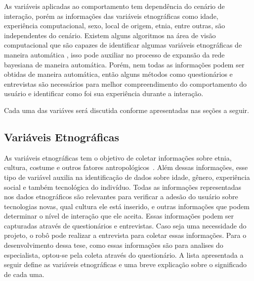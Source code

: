 As variáveis aplicadas ao comportamento tem dependência do cenário de interação, porém as informações das variáveis etnográficas como idade, experiência computacional, sexo, local de origem, etnia, entre outras, são independentes do cenário. Existem alguns algoritmos na área de visão computacional que são capazes de identificar algumas variáveis etnográficas de maneira automática \cite{yang:2007, shan:2012, ylioinas:2012, samadi:2013, amaral:2014}, isso pode auxiliar no processo de expansão da rede bayesiana de maneira automática. Porém, nem todas as informações podem ser obtidas de maneira automática, então alguns métodos como questionários e entrevistas são necessários para melhor compreendimento do comportamento do usuário e identificar como foi sua experiência durante a interação.

Cada uma das variáves será discutida conforme apresentadas nas seções a seguir.

\subsection{Variáveis Etnográficas}
\label{sec:etnograficas}
As variáveis etnográficas tem o objetivo de coletar informações sobre etnia, cultura, costume e outros fatores antropológicos~\cite{borges:2005}. Além dessas informações, esse tipo de variável auxilia na identificação de dados sobre idade, gênero, experiência social e também tecnológica do indivíduo. Todas as informações representadas nos dados etnográficos são relevantes para verificar a adesão do usuário sobre tecnologias novas, qual cultura ele está inserido, e outras informações que podem determinar o nível de interação que ele aceita. Essas informações podem ser capturadas através de questionários e entrevistas. Caso seja uma necessidade do projeto, o robô pode realizar a entrevista para coletar essas informações. Para o desenvolvimento dessa tese, como essas informações são para analises do especialista, optou-se pela coleta através do questionário. A lista apresentada a seguir define as variáveis etnográficas e uma breve explicação sobre o significado de cada uma.

